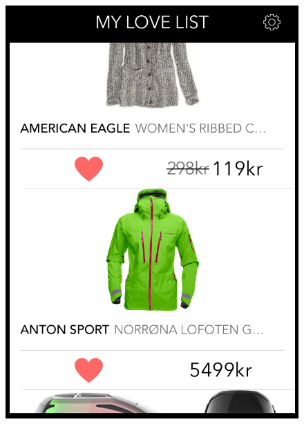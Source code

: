 \begin{figure}[H]
\begin{minipage}{.3\linewidth}
      \includegraphics[height=1.5\linewidth]{image/SoBazaarlovelist.png}
    \end{minipage}
    \hspace{.02\linewidth}
    \begin{minipage}{.3\linewidth}

\end{minipage}
\end{figure}
